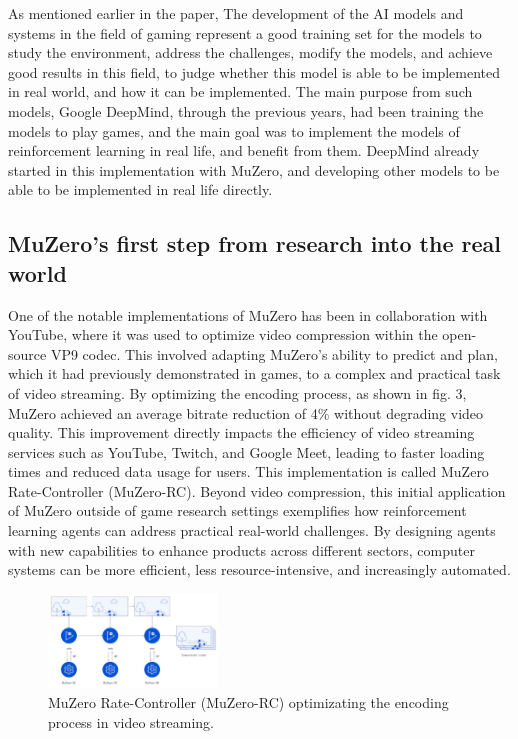 As mentioned earlier in the paper, The development of the AI models and
systems in the field of gaming represent a good training set for the 
models to study the environment, address the challenges, modify the 
models, and achieve good results in this field, to judge whether this 
model is able to be implemented in real world, and how it can be implemented. The main purpose 
from such models, Google DeepMind, through the previous years, had been
training the models to play games, and the main goal was to implement the 
models of reinforcement learning in real life, and benefit from them. 
DeepMind already started in this implementation with
MuZero, and developing other models to be able to be implemented in real life 
directly.
\subsection*{MuZero’s first step from research into the real world}
One of the notable implementations of MuZero has been in collaboration 
with YouTube, where it was used to optimize video compression within 
the open-source VP9 codec. This involved adapting MuZero's ability to 
predict and plan, which it had previously demonstrated in games, to a 
complex and practical task of video streaming. By optimizing the 
encoding process, as shown in fig. 3, MuZero achieved an average bitrate reduction of 
4\% without degrading video quality\cite{FD1}. This improvement directly 
impacts the efficiency of video streaming services such as YouTube, 
Twitch, and Google Meet, leading to faster loading times and reduced 
data usage for users. This implementation is called MuZero Rate-Controller (MuZero-RC).
Beyond video compression, this initial application of MuZero outside 
of game research settings exemplifies how reinforcement learning agents 
can address practical real-world challenges. By designing agents with 
new capabilities to enhance products across different sectors, 
computer systems can be more efficient, less resource-intensive, and 
increasingly automated\cite{FD1}.
\begin{figure}[h]
    \centering
    \includegraphics[width=0.4\textwidth]{sections/8Future Directions/MuZeroRC.jpg}
    
    \caption{MuZero Rate-Controller (MuZero-RC) optimizating the encoding process in video streaming.}
\end{figure}
